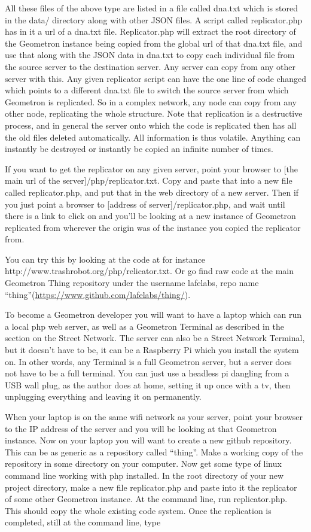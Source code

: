 All these files of the above type are listed in a file called dna.txt which is stored in the data/ directory along with other JSON files.  A script called replicator.php has in it a url of a dna.txt file. Replicator.php will extract the root directory of the Geometron instance being copied from the global url of that dna.txt file, and use that along with the JSON data in dna.txt to copy each individual file from the source server to the destination server.  Any server can copy from any other server with this.  Any given replicator script can have the one line of code changed which points to a different dna.txt file to switch the source server from which Geometron is replicated.  So in a complex network, any node can copy from any other node, replicating the whole structure.  Note that replication is a destructive process, and in general the server onto which the code is replicated then has all the old files deleted automatically.  All information is thus volatile.  Anything can instantly be destroyed or instantly be copied an infinite number of times.
  
If you want to get the replicator on any given server, point your browser to [the main url of the server]/php/replicator.txt.  Copy and paste that into a new file called replicator.php, and put that in the web directory of a new server.  Then if you just point a browser to  [address of server]/replicator.php, and wait until there is a link to click on and you'll be looking at a new instance of Geometron replicated from wherever the origin was of the instance you copied the replicator from.

You can try this by looking at the code at for instance http://www.trashrobot.org/php/relicator.txt.  Or go find raw code at the main Geometron Thing repository under the username lafelabs, repo name ``thing''(\url{https://www.github.com/lafelabs/thing/}).

To become a Geometron developer you will want to have a laptop which can run a local php web server, as well as a Geometron Terminal as described in the section on the Street Network.  The server can also be a Street Network Terminal, but it doesn't have to be, it can be a Raspberry Pi which you install the system on.  In other words, any Terminal is a full Geometron server, but a server does not have to be a full terminal.  You can just use a headless pi dangling from a USB wall plug, as the author does at home, setting it up once with a tv, then unplugging everything and leaving it on permanently.

When your laptop is on the same wifi network as your server, point your browser to the IP address of the server and you will be looking at that Geometron instance.  Now on your laptop you will want to create a new github repository. This can be as generic as a repository called ``thing''.  Make a working copy of the repository in some directory on your computer.  Now get some type of linux command line working with php installed.  In the root directory of your new project directory, make a new file replicator.php and paste into it the replicator of some other Geometron instance.  At the command line, run replicator.php.  This should copy the whole existing code system.  Once the replication is completed, still at the command line, type

